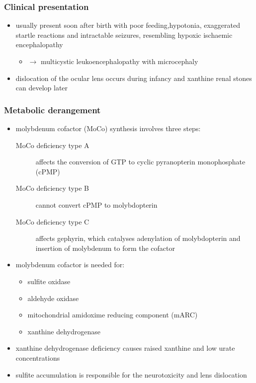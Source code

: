 \documentclass{scrartcl}
\begin{document}
\subsubsection{Clinical presentation}
\label{sec:org3eaa5bd}
\begin{itemize}
\item usually present soon after birth with poor feeding,hypotonia,
exaggerated startle reactions and intractable seizures, resembling
hypoxic ischaemic encephalopathy
\begin{itemize}
\item \(\to\) multicystic leukoencephalopathy with microcephaly
\end{itemize}
\item dislocation of the ocular lens occurs during infancy and xanthine
renal stones can develop later
\end{itemize}

\subsubsection{Metabolic derangement}
\label{sec:org5d20b7f}
\begin{itemize}
\item molybdenum cofactor (MoCo) synthesis involves three steps:
\begin{description}
\item[{MoCo deficiency type A}] affects the conversion of GTP to cyclic
pyranopterin monophosphate (cPMP)
\item[{MoCo deficiency type B}] cannot convert cPMP to molybdopterin
\item[{MoCo deficiency type C}] affects gephyrin, which catalyses
adenylation of molybdopterin and insertion of molybdenum to
form the cofactor
\end{description}
\item molybdenum cofactor is needed for:
\begin{itemize}
\item sulfite oxidase
\item aldehyde oxidase
\item mitochondrial amidoxime reducing component (mARC)
\item xanthine dehydrogenase
\end{itemize}
\item xanthine dehydrogenase deficiency causes raised xanthine and low
urate concentrations
\item sulfite accumulation is responsible for the neurotoxicity and lens
dislocation
\end{itemize}
\end{document}
